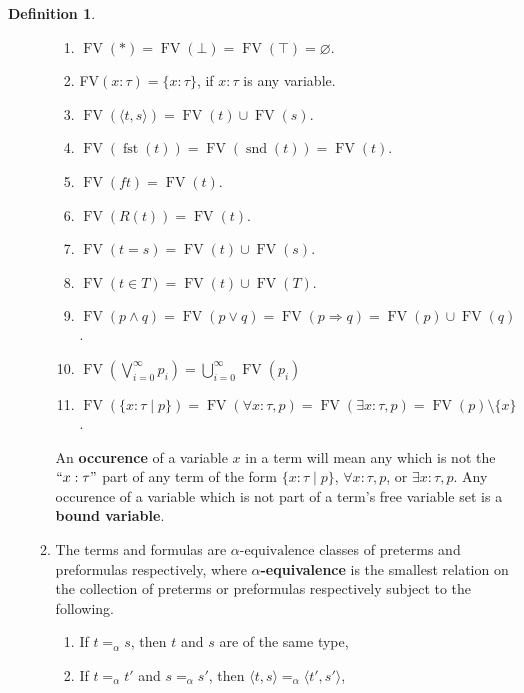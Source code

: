 \documentclass{birkjour}
\theoremstyle{plain}
\theoremstyle{definition}
\newtheorem{definition}[thm]{Definition} %
\begin{document}
\begin{definition}
\begin{enumerate}
\begin{enumerate}
				\begin{enumerate}
					\item $\operatorname{FV}(\ast) = \operatorname{FV}(\bot) = \operatorname{FV}(\top) = \varnothing$.
					\item FV$(x:\tau) = \lbrace x:\tau \rbrace$, if $x:\tau$ is any variable.
					\item $\operatorname{FV}(\langle t,s\rangle) = \operatorname{FV}(t) \cup \operatorname{FV}(s)$.
					\item $\operatorname{FV}(\operatorname{fst}(t)) = \operatorname{FV}(\operatorname{snd}(t)) = \operatorname{FV}(t)$.
					\item $\operatorname{FV}(ft) = \operatorname{FV}(t)$.
					\item $\operatorname{FV}(R(t)) = \operatorname{FV}(t)$.
					\item $\operatorname{FV}(t = s) = \operatorname{FV}(t) \cup \operatorname{FV}(s)$.
					\item $\operatorname{FV}(t \in T) = \operatorname{FV}(t) \cup \operatorname{FV}(T)$.
					\item $\operatorname{FV}(p \wedge q) = \operatorname{FV}(p \vee q) = \operatorname{FV}(p \Rightarrow q) = \operatorname{FV}(p) \cup \operatorname{FV}(q)$.
					\item $\operatorname{FV}(\bigvee_{i = 0}^\infty p_i) = \bigcup_{i = 0}^\infty\operatorname{FV}(p_i)$
					\item $\operatorname{FV}(\lbrace x : \tau \mid p\rbrace) = \operatorname{FV}(\forall x : \tau,p) = \operatorname{FV}(\exists x : \tau,p) = \operatorname{FV}(p) \setminus \lbrace x \rbrace$.
				\end{enumerate}
				An \textbf{occurence} of a variable $x$ in a term will mean any which is not the $``x : \tau"$ part of any term of the form $\lbrace x : \tau\mid p\rbrace$, $\forall x : \tau, p$, or $\exists x : \tau, p$. Any occurence of a variable which is not part of a term's free variable set is a \textbf{bound variable}.
				\item The terms and formulas are $\alpha$-$\text{equivalence}$ classes of preterms and preformulas respectively, where \textbf{$\alpha$-equivalence} is the smallest relation on the collection of preterms or preformulas respectively subject to the following.
				\begin{enumerate}
					\item If $t =_\alpha s$, then $t$ and $s$ are of the same type,
					\item If $t =_\alpha t'$ and $s =_\alpha s'$, then $\langle t,s\rangle =_\alpha \langle t', s'\rangle$,

\end{enumerate}
\end{enumerate}
\end{enumerate}
\end{definition}
\end{document}
